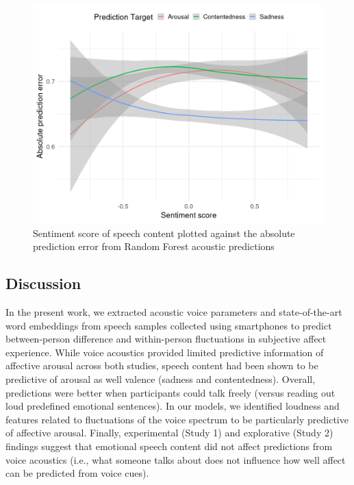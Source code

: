 \documentclass[
  man,floatsintext]{apa6}
\begin{document}
\begin{figure}

{\centering \includegraphics[width=1\linewidth]{../figures/sentiment_error_plot} 

}

\caption[Content sentiment and voice prediction error]{Sentiment score of speech content plotted against the absolute prediction error from Random Forest acoustic predictions}\label{fig:uscontenteffect}
\end{figure}

\newpage

\hypertarget{discussion}{%
\subsection{Discussion}\label{discussion}}

In the present work, we extracted acoustic voice parameters and state-of-the-art word embeddings from speech samples collected using smartphones to predict between-person difference and within-person fluctuations in subjective affect experience. While voice acoustics provided limited predictive information of affective arousal across both studies, speech content had been shown to be predictive of arousal as well valence (sadness and contentedness). Overall, predictions were better when participants could talk freely (versus reading out loud predefined emotional sentences). In our models, we identified loudness and features related to fluctuations of the voice spectrum to be particularly predictive of affective arousal. Finally, experimental (Study 1) and explorative (Study 2) findings suggest that emotional speech content did not affect predictions from voice acoustics (i.e., what someone talks about does not influence how well affect can be predicted from voice cues).
\end{document}
